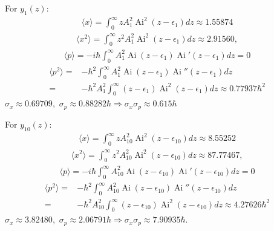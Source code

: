 \begin{enumerate}
    For $y_1(z):$
    \begin{align*}
        \langle x\rangle=\int_{0}^{\infty}
        zA_1^2\operatorname{Ai}^2(z-\epsilon_1)dz\approx1.55874
    \end{align*}
    \begin{align*}
        \langle x^2\rangle=\int_{0}^{\infty}
        z^2A_1^2\operatorname{Ai}^2(z-\epsilon_1)dz\approx2.91560, 
    \end{align*}
    \begin{align*}
        \langle p\rangle=-i\hbar
        \int_{0}^{\infty}
        A_1^2\operatorname{Ai}(z-\epsilon_1)
        \operatorname{Ai}'(z-\epsilon_1)dz=0
    \end{align*}
    \begin{align*}
        \langle p^2\rangle=&-\hbar^2\int_{0}^{\infty}
        A_1^2\operatorname{Ai}(z-\epsilon_1)
        \operatorname{Ai}''(z-\epsilon_1)dz\\
        =&
        -\hbar^2A_1^2\int_{0}^{\infty}
        (z-\epsilon_1)
        \operatorname{Ai}^2(z-\epsilon_1)dz
        \approx0.77937\hbar^2
    \end{align*}    
    $\sigma_x\approx0.69709,$ $\sigma_p\approx0.88282\hbar
    \Rightarrow\sigma_x\sigma_p\approx0.615\hbar$


For $y_{10}(z):$
    \begin{align*}
        \langle x\rangle=\int_{0}^{\infty}
        zA_{10}^2\operatorname{Ai}^2(z-\epsilon_{10})dz
        \approx8.55252
    \end{align*}
    \begin{align*}
        \langle x^2\rangle=\int_{0}^{\infty}
        z^2A_{10}^2\operatorname{Ai}^2(z-\epsilon_{10})dz\approx 87.77467, 
    \end{align*}
    \begin{align*}
        \langle p\rangle=-i\hbar
        \int_{0}^{\infty}
        A_{10}^2\operatorname{Ai}(z-\epsilon_{10})
        \operatorname{Ai}'(z-\epsilon_{10})dz=0
    \end{align*}
    \begin{align*}
        \langle p^2\rangle=&-\hbar^2\int_{0}^{\infty}
        A_{10}^2\operatorname{Ai}(z-\epsilon_{10})
        \operatorname{Ai}''(z-\epsilon_{10})dz\\
        =&
        -\hbar^2A_{10}^2\int_{0}^{\infty}
        (z-\epsilon_{10})
        \operatorname{Ai}^2(z-\epsilon_{10})dz
        \approx4.27626\hbar^2
    \end{align*}    
    $\sigma_x\approx3.82480,$ $\sigma_p\approx2.06791\hbar
    \Rightarrow\sigma_x\sigma_p\approx7.90935\hbar.$


\end{enumerate}
